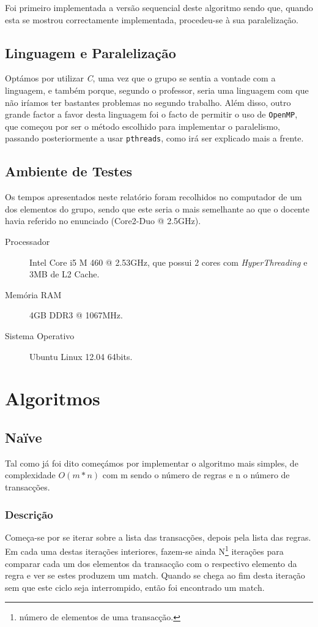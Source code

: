 \documentclass[a4paper]{article}
\begin{document}
Foi primeiro implementada a versão sequencial deste algoritmo sendo que, quando esta se mostrou correctamente implementada, procedeu-se à sua paralelização.

\subsection{Linguagem e Paralelização}
\indent \indent Optámos por utilizar \textit{C}, uma vez que o grupo se sentia a vontade com a linguagem, e também porque, segundo o professor, seria uma linguagem com que não iríamos ter bastantes problemas no segundo trabalho. Além disso, outro grande factor a favor desta linguagem foi o facto de permitir o uso de \texttt{OpenMP}, que começou por ser o método escolhido para implementar o paralelismo, passando posteriormente a usar \texttt{pthreads}, como irá ser explicado mais a frente.

\subsection{Ambiente de Testes}
\indent \indent Os tempos apresentados neste relatório foram recolhidos no computador de um dos elementos do grupo, sendo que este seria o mais semelhante ao que o docente havia referido no enunciado (Core2-Duo @ 2.5GHz).
\begin{description}
	\item [Processador] Intel Core i5 M 460 @ 2.53GHz, que possui 2 cores com \textit{HyperThreading} e 3MB de L2 Cache.
	\item [Memória RAM] 4GB DDR3 @ 1067MHz.
	\item [Sistema Operativo] Ubuntu Linux 12.04 64bits.
\end{description}
\clearpage

\section{Algoritmos}
\subsection{Naïve}
\indent \indent Tal como já foi dito começámos por implementar o algoritmo mais simples, de complexidade $O(m * n)$ com m sendo o número de regras e n o número de transacções.

\subsubsection{Descrição}
Começa-se por se iterar sobre a lista das transacções, depois pela lista das regras. Em cada uma destas iterações interiores, fazem-se ainda N\footnote{número de elementos de uma transacção.} iterações para comparar cada um dos elementos da transacção com o respectivo elemento da regra e ver se estes produzem um match. Quando se chega ao fim desta iteração sem que este ciclo seja interrompido, então foi encontrado um match.
\end{document}
